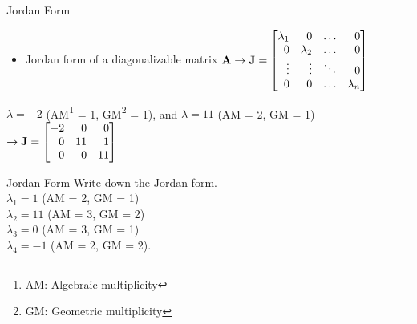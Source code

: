 \documentclass[aspectratio=169]{beamer}
\let\olditem\item
\renewcommand{\item}{\setlength{\itemsep}{\fill}\olditem}
\def\mf{\ensuremath\mathbf}
\def\bmx{\ensuremath\begin{bmatrix*}[r]}
\def\emx{\ensuremath\end{bmatrix*}}
\begin{document}
\begin{frame}{Jordan Form}
\begin{itemize}
    \item  Jordan form of a diagonalizable matrix $\mf{A} \rightarrow \mf{J} = \bmx
    \lambda_1 & 0 & \ldots & 0\\
    0 & \lambda_2 & \ldots & 0\\
    \vdots & \vdots & \ddots & 0\\
    0 & 0 & \ldots & \lambda_n
    \emx$
\end{itemize}

$\lambda = -2$ (AM\footnote{AM: Algebraic multiplicity} = 1, GM\footnote{GM: Geometric multiplicity} = 1), and $\lambda = 11$ (AM = 2, GM = 1) $\rightarrow \mf{J} = \bmx
-2 & 0 & 0\\
0 & 11 & 1\\
0 & 0 & 11
\emx$
\end{frame}


\begin{frame}[t]{Jordan Form}
Write down the Jordan form.\\$\lambda_1 = 1$ (AM = 2, GM = 1)\\$\lambda_2 = 11$ (AM = 3, GM = 2)\\$\lambda_3 = 0$ (AM = 3, GM = 1)\\$\lambda_4 = -1$ (AM = 2, GM = 2).
\end{frame}
\end{document}
